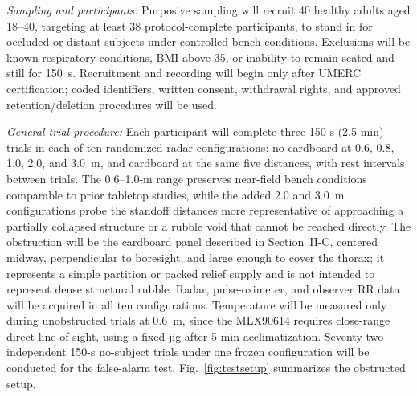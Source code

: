 \documentclass[10pt,conference]{IEEEtran}
\begin{document}
\textit{Sampling and participants:} Purposive sampling will recruit 40 healthy adults aged 18--40, targeting at least 38 protocol-complete participants, to stand in for occluded or distant subjects under controlled bench conditions. Exclusions will be known respiratory conditions, BMI above 35, or inability to remain seated and still for 150~s. Recruitment and recording will begin only after UMERC certification; coded identifiers, written consent, withdrawal rights, and approved retention/deletion procedures will be used.

\textit{General trial procedure:} Each participant will complete three 150-s (2.5-min) trials in each of ten randomized radar configurations: no cardboard at 0.6, 0.8, 1.0, 2.0, and 3.0~m, and cardboard at the same five distances, with rest intervals between trials. The 0.6--1.0-m range preserves near-field bench conditions comparable to prior tabletop studies, while the added 2.0 and 3.0~m configurations probe the standoff distances more representative of approaching a partially collapsed structure or a rubble void that cannot be reached directly. The obstruction will be the cardboard panel described in Section~II-C, centered midway, perpendicular to boresight, and large enough to cover the thorax; it represents a simple partition or packed relief supply and is not intended to represent dense structural rubble. Radar, pulse-oximeter, and observer RR data will be acquired in all ten configurations. Temperature will be measured only during unobstructed trials at 0.6~m, since the MLX90614 requires close-range direct line of sight, using a fixed jig after 5-min acclimatization. Seventy-two independent 150-s no-subject trials under one frozen configuration will be conducted for the false-alarm test. Fig.~\ref{fig:testsetup} summarizes the obstructed setup.
\end{document}
